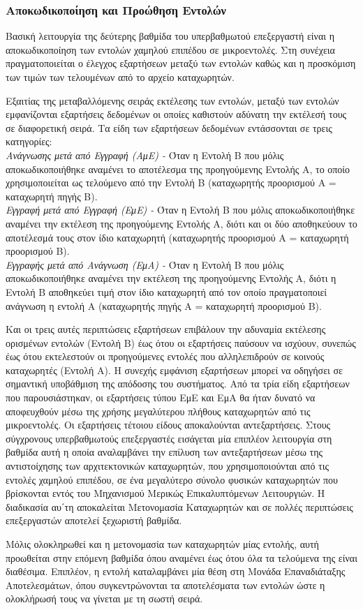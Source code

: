 \subsubsection*{Αποκωδικοποίηση και Προώθηση Εντολών}
\label{chap2_InstructionDecodeDispatch}

Βασική λειτουργία της δεύτερης βαθμίδα του υπερβαθμωτού επεξεργαστή είναι η αποκωδικοποίηση των εντολών χαμηλού επιπέδου σε μικροεντολές. Στη συνέχεια πραγματοποιείται ο έλεγχος εξαρτήσεων μεταξύ των εντολών καθώς και η προσκόμιση των τιμών των τελουμένων από το αρχείο καταχωρητών.
\par
Εξαιτίας της μεταβαλλόμενης σειράς εκτέλεσης των εντολών, μεταξύ των εντολών εμφανίζονται εξαρτήσεις δεδομένων οι οποίες καθιστούν αδύνατη την εκτέλεσή τους σε διαφορετική σειρά. Τα είδη των εξαρτήσεων δεδομένων εντάσσονται σε τρεις κατηγορίες:\\
\textit{Ανάγνωσης μετά από Εγγραφή (ΑμΕ) -} Όταν η Εντολή Β που μόλις αποκωδικοποιήθηκε αναμένει το αποτέλεσμα της προηγούμενης Εντολής Α, το οποίο χρησιμοποιείται ως τελούμενο από την Εντολή Β (καταχωρητής προορισμού Α = καταχωρητή πηγής Β).\\
\textit{Εγγραφή μετά από Εγγραφή (ΕμΕ) -} Όταν η Εντολή Β που μόλις αποκωδικοποιήθηκε αναμένει την εκτέλεση της προηγούμενης Εντολής Α, διότι και οι δύο αποθηκεύουν το αποτέλεσμά τους στον ίδιο καταχωρητή (καταχωρητής προορισμού Α = καταχωρητή προορισμού Β).\\
\textit{Εγγραφής μετά από Ανάγνωση (ΕμΑ) -} Όταν η Εντολή Β που μόλις αποκωδικοποιήθηκε αναμένει την εκτέλεση της προηγούμενης Εντολής Α, διότι η Εντολή Β αποθηκεύει τιμή στον ίδιο καταχωρητή από τον οποίο πραγματοποιεί ανάγνωση η εντολή Α (καταχωρητής πηγής Α = καταχωρητή προορισμού Β).
\par
Και οι τρεις αυτές περιπτώσεις εξαρτήσεων επιβάλουν την αδυναμία εκτέλεσης ορισμένων εντολών (Εντολή Β) έως ότου οι εξαρτήσεις παύσουν να ισχύουν, συνεπώς έως ότου εκτελεστούν οι προηγούμενες εντολές που αλληλεπιδρούν σε κοινούς καταχωρητές (Εντολή Α). Η συνεχής εμφάνιση εξαρτήσεων μπορεί να οδηγήσει σε σημαντική υποβάθμιση της απόδοσης του συστήματος. Από τα τρία είδη εξαρτήσεων που παρουσιάστηκαν, οι εξαρτήσεις τύπου ΕμΕ και ΕμΑ θα ήταν δυνατό να αποφευχθούν μέσω της χρήσης μεγαλύτερου πλήθους καταχωρητών από τις μικροεντολές. Οι εξαρτήσεις τέτοιου είδους αποκαλούνται αντεξαρτήσεις. Στους σύγχρονους υπερβαθμωτούς επεξεργαστές εισάγεται μία επιπλέον λειτουργία στη βαθμίδα αυτή η οποία αναλαμβάνει την επίλυση των αντεξαρτήσεων μέσω της αντιστοίχησης των αρχιτεκτονικών καταχωρητών, που χρησιμοποιούνται από τις εντολές χαμηλού επιπέδου, σε ένα μεγαλύτερο σύνολο φυσικών καταχωρητών που βρίσκονται εντός του Μηχανισμού Μερικώς Επικαλυπτόμενων Λειτουργιών. Η διαδικασία αυ΄τη αποκαλείται Μετονομασία Καταχωρητών και σε πολλές περιπτώσεις επεξεργαστών αποτελεί ξεχωριστή βαθμίδα.
\par
Μόλις ολοκληρωθεί και η μετονομασία των καταχωρητών μίας εντολής, αυτή προωθείται στην επόμενη βαθμίδα όπου αναμένει έως ότου όλα τα τελούμενα της είναι διαθέσιμα. Επιπλέον, η εντολή καταλαμβάνει μία θέση στη Μονάδα Επαναδιάταξης Αποτελεσμάτων, όπου συγκεντρώνονται τα αποτελέσματα των εντολών ώστε η ολοκλήρωσή τους να γίνεται με τη σωστή σειρά.


